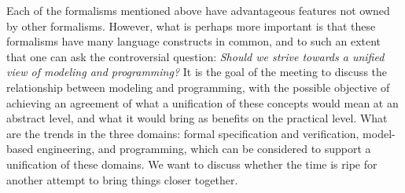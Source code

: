 Each of the formalisms mentioned above have advantageous features not owned by other formalisms. However, what is perhaps more important is that these formalisms have many language constructs in common, and to  such an extent that one can ask the controversial question: 
{\em Should we strive towards a unified view of modeling and 
programming?} 
It is the goal of the meeting to discuss the 
relationship between modeling and programming, with the possible 
objective of achieving an agreement of what a unification of these 
concepts would mean at an abstract level, and what it would bring 
as benefits on the practical level. What are the trends in the 
three domains: formal specification and verification,
model-based engineering, and
programming, which can be considered 
to support a unification of these domains. We want to discuss whether the time 
is ripe for another attempt to bring things closer together. 

